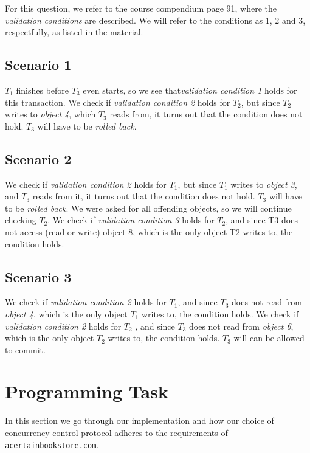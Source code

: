 \documentclass[11pt]{article}
\begin{document}
For this question, we refer to the course compendium page 91, where
the \emph{validation conditions} are described. We will refer to the conditions as
1, 2 and 3, respectfully, as listed in the material.

\subsection*{Scenario 1}

$T_1$ finishes before $T_3$ even starts, so we see that\emph{validation
condition 1} holds for this transaction. We check if \emph{validation
condition 2} holds for $T_2$, but since $T_2$ writes to \emph{object 4},
which $T_3$ reads from, it turns out that the condition does not hold.
$T_3$ will have to be \emph{rolled back}.

\subsection*{Scenario 2}

We check if \emph{validation condition 2} holds for $T_1$, but since $T_1$
writes to \emph{object 3}, and $T_3$ reads from it, it turns out that the
condition does not hold. $T_3$ will have to be \emph{rolled back}. We were 
asked for all offending objects, so we will continue checking $T_2$. We
check if \emph{validation condition 3} holds for $T_2$, and since T3 does
not access (read or write) object 8, which is the only object T2 writes to,
the condition holds.

\subsection*{Scenario 3}

We check if \emph{validation condition 2} holds for $T_1$, and since $T_3$
does not read from \emph{object 4}, which is the only object $T_1$ writes to,
the condition holds. We check if \emph{validation condition 2} holds for $T_2$
, and since $T_3$ does not read from \emph{object 6}, which is the only object
$T_2$ writes to, the condition holds. $T_3$ will can be allowed to commit.

\section*{Programming Task}

In this section we go through our implementation and how our choice of
concurrency control protocol adheres to the requirements of
\texttt{acertainbookstore.com}.
\end{document}
